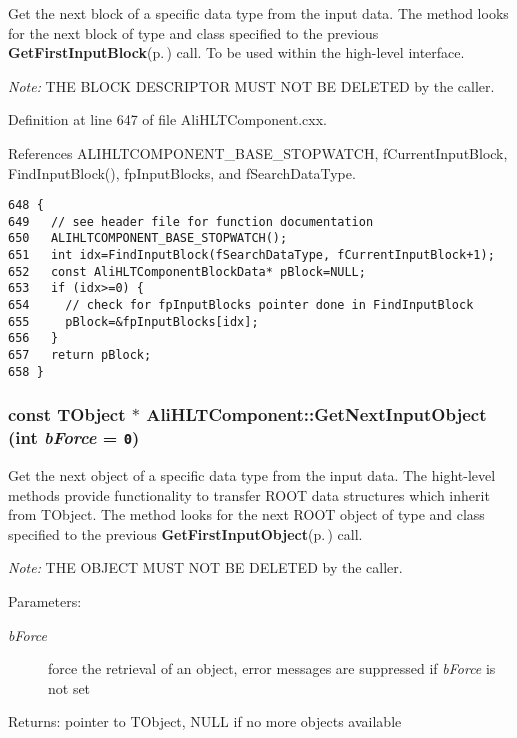 Get the next block of a specific data type from the input data. The method looks for the next block of type and class specified to the previous {\bf Get\-First\-Input\-Block}{\rm (p.\,\pageref{classAliHLTComponent_b18})} call. To be used within the high-level interface.\par
 {\em Note:\/} THE BLOCK DESCRIPTOR MUST NOT BE DELETED by the caller. 

Definition at line 647 of file Ali\-HLTComponent.cxx.

References ALIHLTCOMPONENT\_\-BASE\_\-STOPWATCH, f\-Current\-Input\-Block, Find\-Input\-Block(), fp\-Input\-Blocks, and f\-Search\-Data\-Type.

\footnotesize\begin{verbatim}648 {
649   // see header file for function documentation
650   ALIHLTCOMPONENT_BASE_STOPWATCH();
651   int idx=FindInputBlock(fSearchDataType, fCurrentInputBlock+1);
652   const AliHLTComponentBlockData* pBlock=NULL;
653   if (idx>=0) {
654     // check for fpInputBlocks pointer done in FindInputBlock
655     pBlock=&fpInputBlocks[idx];
656   }
657   return pBlock;
658 }
\end{verbatim}\normalsize 


\subsubsection{\setlength{\rightskip}{0pt plus 5cm}const TObject $\ast$ Ali\-HLTComponent::Get\-Next\-Input\-Object (int {\em b\-Force} = {\tt 0})\hspace{0.3cm}{\tt  [protected]}}\label{classAliHLTComponent_b15}


Get the next object of a specific data type from the input data. The hight-level methods provide functionality to transfer ROOT data structures which inherit from TObject. The method looks for the next ROOT object of type and class specified to the previous {\bf Get\-First\-Input\-Object}{\rm (p.\,\pageref{classAliHLTComponent_b13})} call.\par
 {\em Note:\/} THE OBJECT MUST NOT BE DELETED by the caller. \begin{Desc}
\item[Parameters:]
\begin{description}
\item[{\em b\-Force}]force the retrieval of an object, error messages are suppressed if {\em b\-Force\/} is not set \end{description}
\end{Desc}
\begin{Desc}
\item[Returns:]pointer to TObject, NULL if no more objects available \end{Desc}


